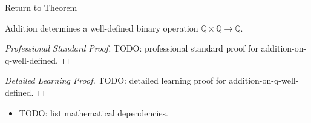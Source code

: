 \newpage
{}
\label{prf:addition-on-q-well-defined}

\begin{remark*}[Return]
\hyperref[thm:addition-on-q-well-defined]{Return to Theorem}
\end{remark*}

\begin{theorem*}
Addition determines a well-defined binary operation
$\mathbb{Q}\times\mathbb{Q}\to\mathbb{Q}$.
\end{theorem*}

\begin{proof}[Professional Standard Proof]
\LRAProofBodyStart
TODO: professional standard proof for addition-on-q-well-defined.
\end{proof}

\begin{proof}[Detailed Learning Proof]
\LRAProofBodyStart
TODO: detailed learning proof for addition-on-q-well-defined.
\end{proof}

\begin{remark*}
\end{remark*}

\begin{dependencies}
\begin{itemize}
  \item TODO: list mathematical dependencies.
\end{itemize}
\end{dependencies}

\clearpage
